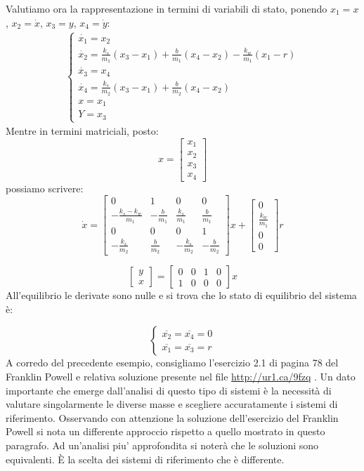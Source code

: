 \documentclass[a4paper]{report}
\begin{document}
Valutiamo ora la rappresentazione in termini di variabili di stato,
ponendo $x_1 = x$, $x_2 = \dot{x}$, $x_3 = y$, $x_4 = \dot{y}$:
\begin{eqnarray*}
  \left\{ \begin{array}{l}
    \dot{x_1} = x_2\\
    \dot{x_2} = \frac{k_s}{m_1}(x_3 - x_1) + \frac{b}{m_1}(x_4 - x_2)
    - \frac{k_w}{m_1}(x_1 - r)\\
    \dot{x_3} = x_4\\
    \dot{x_4} = \frac{k_s}{m_2}(x_3 - x_1) + \frac{b}{m_2}(x_4 -
    x_2)\\
    x = x_1\\
    Y = x_3
    \end{array}\right .
\end{eqnarray*}
Mentre in termini matriciali, posto:
\[
  x = 
  \begin{bmatrix}
    x_1\\
    x_2\\
    x_3\\
    x_4
  \end{bmatrix}
\]
possiamo scrivere:
\[
  \dot{x} = 
  \begin{bmatrix}
    0 & 1 & 0 & 0\\
    -\frac{k_s - k_w}{m_1} & -\frac{b}{m_1} & \frac{k_s}{m_1} &
    \frac{b}{m_1}\\
    0 & 0 & 0 & 1\\
    -\frac{k_s}{m_2} & \frac{b}{m_2} & -\frac{k_s}{m_2} &
    -\frac{b}{m_2}
  \end{bmatrix}x +
  \begin{bmatrix}
    0\\
    \frac{k_w}{m_1}\\
    0\\
    0
  \end{bmatrix}r
\]

\[
  \begin{bmatrix}
    y\\x
  \end{bmatrix} = 
  \begin{bmatrix}
    0 & 0 & 1 & 0\\
    1 & 0 & 0 & 0
  \end{bmatrix}x
\]
All'equilibrio le derivate sono nulle e si trova che lo stato di
equilibrio del sistema \`e:

\[
  \left\{
  \begin{array}{l}
    \overline{x_2} = \overline{x_4} = 0\\
    \overline{x_1} = \overline{x_3} = r
  \end{array} \right .
\]
A corredo del precedente esempio, consigliamo l'esercizio 2.1 di
pagina 78 del Franklin Powell e relativa soluzione presente nel file
\url{http://ur1.ca/9fzq} . Un dato importante che emerge dall'analisi
di questo tipo di sistemi \`e la necessit\`a di valutare singolarmente
le diverse masse e scegliere accuratamente i sistemi di
riferimento. Osservando con attenzione la soluzione dell'esercizio del
Franklin Powell si nota un differente approccio rispetto a quello
mostrato in questo paragrafo. Ad un'analisi piu' approfondita si
noter\`a che le soluzioni sono equivalenti. \`E la scelta dei sistemi
di riferimento che \`e differente.
\end{document}
